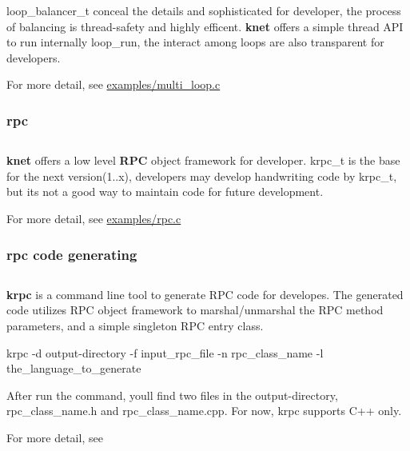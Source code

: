 {\ttfamily loop\+\_\+balancer\+\_\+t} conceal the details and sophisticated for developer, the process of balancing is thread-\/safety and highly efficent. {\bfseries knet} offers a simple thread A\+P\+I to run internally {\ttfamily loop\+\_\+run}, the interact among loops are also transparent for developers.

For more detail, see {\ttfamily \hyperlink{multi__loop_8c}{examples/multi\+\_\+loop.\+c}}

\subsubsection*{rpc}

\subsection*{}

{\bfseries knet} offers a low level {\bfseries R\+P\+C} object framework for developer. {\ttfamily krpc\+\_\+t} is the base for the next version(1..\+x), developers may develop handwriting code by {\ttfamily krpc\+\_\+t}, but its not a good way to maintain code for future development.

For more detail, see {\ttfamily \hyperlink{examples_2rpc_8c}{examples/rpc.\+c}}

\subsubsection*{rpc code generating}

\subsection*{}

{\bfseries krpc} is a command line tool to generate R\+P\+C code for developes. The generated code utilizes R\+P\+C object framework to marshal/unmarshal the R\+P\+C method parameters, and a simple singleton R\+P\+C entry class.

{\ttfamily krpc -\/d output-\/directory -\/f input\+\_\+rpc\+\_\+file -\/n rpc\+\_\+class\+\_\+name -\/l the\+\_\+language\+\_\+to\+\_\+generate}

After run the command, you\textquotesingle{}ll find two files in the output-\/directory, {\ttfamily rpc\+\_\+class\+\_\+name.\+h} and {\ttfamily rpc\+\_\+class\+\_\+name.\+cpp}. For now, {\ttfamily krpc} supports C++ only.

For more detail, see


